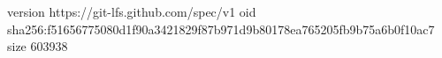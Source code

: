version https://git-lfs.github.com/spec/v1
oid sha256:f51656775080d1f90a3421829f87b971d9b80178ea765205fb9b75a6b0f10ac7
size 603938

